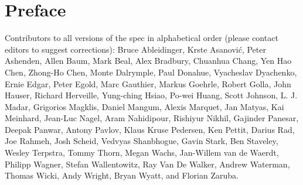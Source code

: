 \chapter{Preface}

Contributors to all versions of the spec in alphabetical order (please contact
editors to suggest corrections):
Bruce Ableidinger,
Krste Asanovi\'{c},
Peter Ashenden,
Allen Baum,
Mark Beal,
Alex Bradbury,
Chuanhua Chang,
Yen Hao Chen,
Zhong-Ho Chen,
Monte Dalrymple,
Paul Donahue,
Vyacheslav Dyachenko,
Ernie Edgar,
Peter Egold,
Marc Gauthier,
Markus Goehrle,
Robert Golla,
John Hauser,
Richard Herveille,
Yung-ching Hsiao,
Po-wei Huang,
Scott Johnson,
L. J. Madar,
Grigorios Magklis,
Daniel Mangum,
Alexis Marquet,
Jan Matyas,
Kai Meinhard,
Jean-Luc Nagel,
Aram Nahidipour,
Rishiyur Nikhil,
Gajinder Panesar,
Deepak Panwar,
Antony Pavlov,
Klaus Kruse Pedersen,
Ken Pettit,
Darius Rad,
Joe Rahmeh,
Josh Scheid,
Vedvyas Shanbhogue,
Gavin Stark,
Ben Staveley,
Wesley Terpstra,
Tommy Thorn,
Megan Wachs,
Jan-Willem van de Waerdt,
Philipp Wagner,
Stefan Wallentowitz,
Ray Van De Walker,
Andrew Waterman,
Thomas Wicki,
Andy Wright,
Bryan Wyatt,
and Florian Zaruba.
